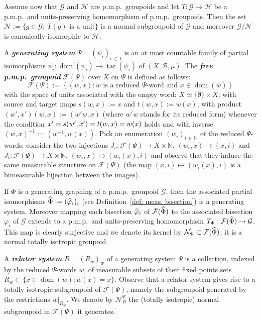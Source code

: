 \documentclass[AHL,Unicode,longabstracts,published]{cedram}
\newcommand{\defin}[1]{\textbf{\emph{#1}}}
\newcommand{\Nmath}{\mathbb{N}}
\newcommand{\cn}{\mathcal{N}}
\newcommand{\ch}{\mathcal{H}}
\newcommand{\cg}{\mathcal{G}}
\newcommand{\cf}{\mathcal{F}}
\newcommand{\rb}{\mathscr{B}}
\DeclareMathOperator{\dom}{dom}
\DeclareMathOperator{\tar}{tar}
\newcommand{\ph}{\varphi}
\newcommand{\pmp}{p.m.p.\ }
\let\oldhat\hat
\renewcommand*{\hat}[1]{\mathchoice{\widehat{#1}}{\widehat{#1}}{\oldhat{#1}}{\oldhat{#1}}}
\begin{document}
Assume now that $\cg$ and $\ch$ are \pmp groupoids and let $T:\cg\rightarrow \ch$ be a \pmp and units-preserving homomorphism of \pmp groupoids. Then the set $\cn:=\{g\in \cg:\ T(g)\text{ is a unit}\}$ is a normal subgroupoid of $\cg$ and moreover $\cg/\cn$ is canonically isomorphic to $\ch$.



A \defin{generating system} $\Psi=(\psi_i)_{i\,\in\,I}$ is an at most countable family of partial isomorphisms $\psi_i:\dom(\psi_i)\to \tar(\psi_i)$ of $(X,\rb, \mu)$. The \defin{free \pmp groupoid} $\cf(\Psi)$ over $X$ on $\Psi$ is defined as follows:
\[
\cf(\Psi):=\left\{(w,x): w \text{ is a reduced $\Psi$-word and } x\in \dom(w) \right\}
\]
with the space of units associated with the empty word: $X \simeq \{\emptyset\} \times X$; with source and target maps $s(w,x):=x$ and $t(w,x):=w(x)$; with product $(w',x')(w,x):=(w'w,x)$ (where $w'w$ stands for its reduced form) whenever the condition $x'=s(w',x')\linebreak=t(w,x)=w(x)$ holds and with inverse $(w,x)^{-1}:=(w^{-1}, w(x))$. Pick an enumeration $(w_i)_{i\,\in\,\Nmath}$ of the reduced $\Psi$-words; consider the two injections $J_s:\cf(\Psi)\to X\times \Nmath$, $(w_i, x)\mapsto (x,i)$ and $J_t:\cf(\Psi)\to X\times \Nmath$, $(w_i, x)\mapsto (w_i(x),i)$ and observe that they induce the same measurable structure on $\cf(\Psi)$ (the map $(x,i)\mapsto (w_i(x),i)$ is a bimeasurable bijection between the images).

\begin{rema}
If $\Phi$ is a generating graphing of a \pmp groupoid $\cg$, then the associated partial isomorphisms $\hat \Phi:=(\hat \ph_i)_i$ (see Definition~\ref{def: meas. bisection}) is a generating system. Moreover mapping each bisection $\hat \ph_i$ of $\cf(\hat\Phi)$ to the associated bisection $\ph_i$ of $\cg$ extends to a \pmp and units-preserving homomorphism $T_\Phi:\cf(\hat\Phi)\rightarrow \cg$. This map is clearly surjective and we denote its kernel by $\cn_\Phi\subset \cf(\hat\Phi)$: it is a normal totally isotropic groupoid.
\end{rema}

A \defin{relator system} $R=(R_w)_w$ of a generating system $\Psi$ is a collection, indexed by the reduced $\Psi$-words $w$, of measurable subsets of their fixed points sets $R_w\subset \{x\in \dom(w): w(x)=x\}$. Observe that a relator system gives rise to a totally isotropic subgroupoid of $\cf(\Psi)$, namely the subgroupoid generated by the restrictions $w|_{R_w}$. We denote by $\cn_R^{\Psi}$ the (totally isotropic) normal subgroupoid in $\cf(\Psi)$ it generates.
\end{document}
